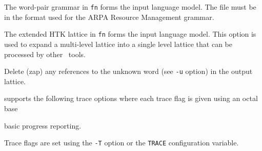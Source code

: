 \begin{optlist}
   The word-pair grammar in {\tt fn} 
              forms the input language model. The file must be in
         the format used for the ARPA Resource Management grammar.

   The extended HTK lattice in {\tt fn} 
              forms the input language model. This option is
              used to expand a multi-level lattice into a single
              level lattice that can be processed by other \HTK\ tools.

   Delete (zap) any references to the unknown word (see {\tt -u} 
              option) in the output lattice.

\end{optlist}


 supports the following trace options where each
trace flag is given using an octal base
\begin{optlist}
    basic progress reporting.
\end{optlist}
Trace flags are set using the \texttt{-T} option or the  \texttt{TRACE} 
configuration variable.


